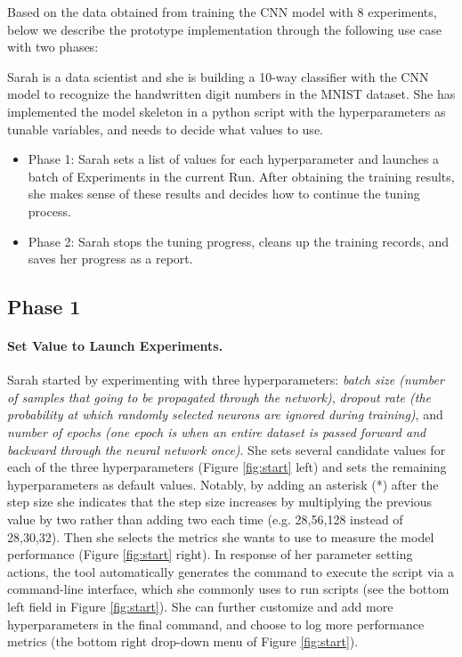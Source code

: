 \documentclass[preprint]{vgtc}        %
\begin{document}
Based on the data obtained from training the CNN model with 8 experiments, below we describe the prototype implementation through the following use case with two phases: 

Sarah is a data scientist and she is building a 10-way classifier with the CNN model to recognize the handwritten digit numbers in the MNIST dataset. She has implemented the model skeleton in a python script with the hyperparameters as tunable variables, and needs to decide what values to use.
\begin{itemize}
\item[] Phase 1: Sarah sets a list of values for each hyperparameter and launches a batch of \textsf{Experiments} in the current \textsf{Run}. After obtaining the training results, she makes sense of these results and decides how to continue the tuning process. 
\item[] Phase 2: Sarah stops the tuning progress, cleans up the training records, and saves her progress as a report.
\end{itemize}

\subsection{Phase 1}
\paragraph{Set Value to Launch Experiments.} Sarah started by experimenting with three hyperparameters: \textit{batch size (number of samples that going to be propagated through the network)}, \textit{dropout rate (the probability at which randomly selected neurons are ignored during training)}, and \textit{number of epochs (one epoch is when an entire dataset is passed forward and backward through the neural network once)}. She sets several candidate values for each of the three hyperparameters (Figure \ref{fig:start} left) and sets the remaining hyperparameters as default values. Notably, by adding an asterisk (*) after the step size she indicates that the step size increases by multiplying the previous value by two rather than adding two each time (e.g. 28,56,128 instead of 28,30,32). Then she selects the metrics she wants to use to measure the model performance (Figure \ref{fig:start} right). 
In response of her parameter setting actions, the tool automatically generates the command to execute the script via a command-line interface, which she commonly uses to run scripts (see the bottom left field in Figure \ref{fig:start}). She can further customize and add more hyperparameters in the final command, and choose to log more performance metrics (the bottom right drop-down menu of Figure \ref{fig:start}).
\end{document}
